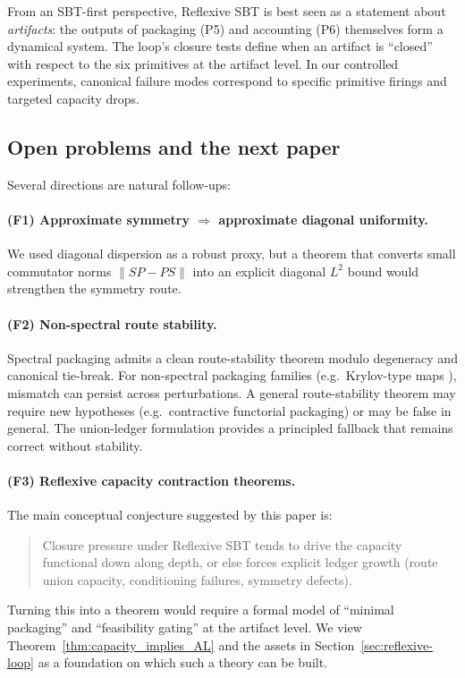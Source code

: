 \documentclass[11pt]{article}
\theoremstyle{plain}
\theoremstyle{definition}
\theoremstyle{remark}
\begin{document}
From an SBT-first perspective, Reflexive SBT is best seen as a statement about \emph{artifacts}:
the outputs of packaging (P5) and accounting (P6) themselves form a dynamical system.
The loop's closure tests define when an artifact is ``closed'' with respect to the six primitives at the artifact level.
In our controlled experiments, canonical failure modes correspond to specific primitive firings and targeted capacity drops.

\subsection{Open problems and the next paper}\label{subsec:open_problems}

Several directions are natural follow-ups:

\paragraph{(F1) Approximate symmetry \(\Rightarrow\) approximate diagonal uniformity.}
We used diagonal dispersion as a robust proxy, but a theorem that converts small commutator norms \(\|SP-PS\|\) into an explicit diagonal \(L^2\) bound would strengthen the symmetry route.

\paragraph{(F2) Non-spectral route stability.}
Spectral packaging admits a clean route-stability theorem modulo degeneracy and canonical tie-break.
For non-spectral packaging families (e.g.\ Krylov-type maps \cite{saad2011_large_eigs}), mismatch can persist across perturbations.
A general route-stability theorem may require new hypotheses (e.g.\ contractive functorial packaging) or may be false in general.
The union-ledger formulation provides a principled fallback that remains correct without stability.

\paragraph{(F3) Reflexive capacity contraction theorems.}
The main conceptual conjecture suggested by this paper is:
\begin{quote}
Closure pressure under Reflexive SBT tends to drive the capacity functional down along depth, or else forces explicit ledger growth (route union capacity, conditioning failures, symmetry defects).
\end{quote}
Turning this into a theorem would require a formal model of ``minimal packaging'' and ``feasibility gating'' at the artifact level.
We view Theorem~\ref{thm:capacity_implies_AL} and the assets in Section~\ref{sec:reflexive-loop} as a foundation on which such a theory can be built.
\end{document}
